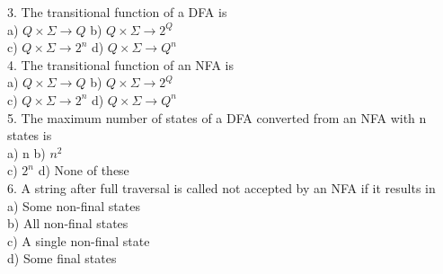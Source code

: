 \vspace*{0.2cm}
3. The transitional function of a DFA is\\
\hspace*{0.5cm} a) $Q \times \Sigma \rightarrow Q$    \hspace*{0.7cm}  b) $Q \times \Sigma \rightarrow 2^Q$\\
\hspace*{0.5cm} c) $Q \times \Sigma \rightarrow 2^n$  \hspace*{0.7cm}  d) $Q \times \Sigma \rightarrow Q^n$\\


\vspace*{0.2cm}
4. The transitional function of an NFA is \\
\hspace*{0.5cm} a) $Q \times \Sigma \rightarrow Q$      \hspace*{0.7cm} b) $Q \times \Sigma \rightarrow 2^Q$ \\
\hspace*{0.5cm} c) $Q \times \Sigma \rightarrow 2^n$    \hspace*{0.7cm} d) $Q \times \Sigma \rightarrow Q^n$ \\


\vspace*{0.2cm}
5. The maximum number of states of a DFA converted from an NFA with n states is \\
\hspace*{0.5cm} a) n          \hspace*{0.7cm}    b) $n^2$ \\
\hspace*{0.5cm} c) $2^n$    \hspace*{0.7cm}    d) None of these \\

\vspace*{0.2cm}
6. A string after full traversal is called not accepted by an NFA if it results in\\
\hspace*{0.5cm} a) Some non-final states\\
\hspace*{0.5cm} b) All non-final states\\
\hspace*{0.5cm} c) A single non-final state \\
\hspace*{0.5cm} d) Some final states \\

\vspace*{0.2cm}

